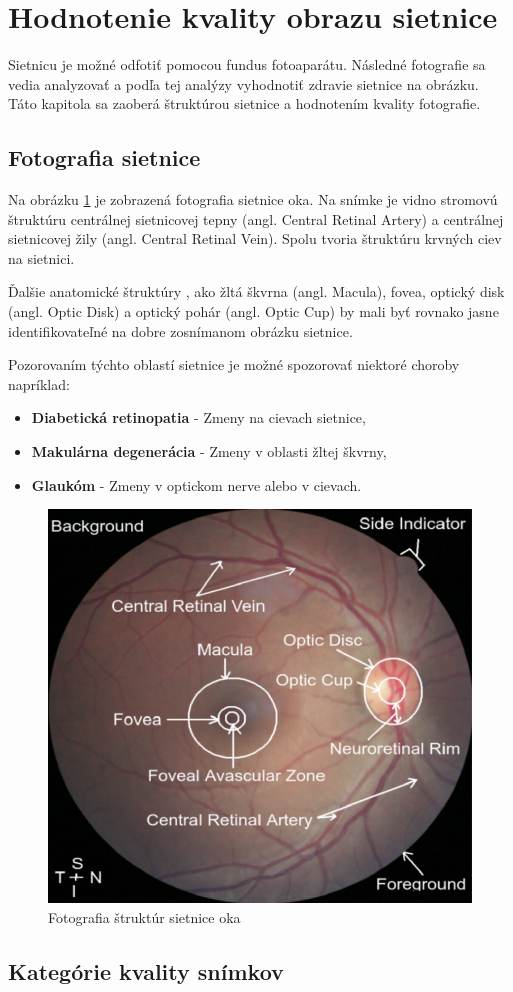 \documentclass[a4paper, 11pt]{article}
\begin{document}
\section{Hodnotenie kvality obrazu sietnice}
Sietnicu je možné odfotiť pomocou fundus fotoaparátu. Následné fotografie sa vedia analyzovať a podľa tej analýzy vyhodnotiť zdravie sietnice na obrázku. Táto kapitola sa zaoberá štruktúrou sietnice a hodnotením kvality fotografie.
\subsection{Fotografia sietnice}
Na obrázku \ref{fig:retina_struct} je zobrazená fotografia sietnice oka. Na snímke je vidno \cite{OCY_veducko} stromovú štruktúru centrálnej sietnicovej tepny (angl. Central Retinal Artery) a centrálnej sietnicovej žily (angl. Central Retinal Vein). Spolu tvoria štruktúru krvných ciev na sietnici.

Ďalšie anatomické štruktúry \cite{OCY_veducko}, ako žltá škvrna (angl. Macula), fovea, optický disk (angl. Optic Disk) a optický pohár (angl. Optic Cup) by mali byť rovnako jasne identifikovateľné na dobre zosnímanom obrázku sietnice.

\medskip\noindent Pozorovaním týchto oblastí sietnice je možné spozorovať niektoré choroby \cite{RetImag} napríklad:
\begin{itemize}
    \item \textbf{Diabetická retinopatia} - Zmeny na cievach sietnice,
    \item \textbf{Makulárna degenerácia} - Zmeny v oblasti žltej škvrny,
    \item \textbf{Glaukóm} - Zmeny v optickom nerve alebo v cievach.
\end{itemize}

\begin{figure}[b!]
    \centering
    \includegraphics[width=0.3285\linewidth]{images/retina_struct.png}
    \caption{Fotografia štruktúr sietnice oka \cite{OCY_veducko}}
    \label{fig:retina_struct}
\end{figure}
\subsection{Kategórie kvality snímkov}
\end{document}
